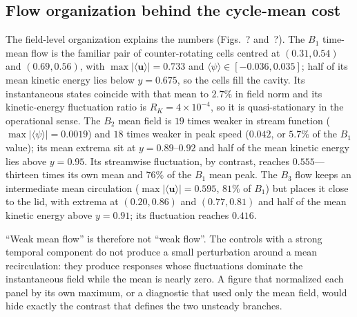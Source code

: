 \documentclass[11pt,a4paper]{article}
\newenvironment{chgdel}{\par\color{red}}{\par\color{black}}
\begin{document}
\subsection{Flow organization behind the cycle-mean cost}
\label{sec:topology}

\begin{chgdel}
The field-level organization explains the numbers (Figs.~?
and~?). The $B_1$ time-mean flow is the familiar pair of
counter-rotating cells centred at $(0.31,0.54)$ and $(0.69,0.56)$, with
$\max|\langle\mathbf{u}\rangle|=0.733$ and $\langle\psi\rangle\in[-0.036,0.035]$;
half of its mean kinetic energy lies below $y=0.675$, so the cells fill the
cavity. Its instantaneous states coincide with that mean to $2.7\%$ in field norm
and its kinetic-energy fluctuation ratio is $R_K=4\times10^{-4}$, so it is
quasi-stationary in the operational sense. The $B_2$ mean field is $19$ times
weaker in stream function ($\max|\langle\psi\rangle|=0.0019$) and $18$ times weaker
in peak speed ($0.042$, or $5.7\%$ of the $B_1$ value); its mean extrema sit at
$y=0.89$--$0.92$ and half of the mean kinetic energy lies above $y=0.95$. Its
streamwise fluctuation, by contrast, reaches $0.555$---thirteen times its own mean
and $76\%$ of the $B_1$ mean peak. The $B_3$ flow keeps an intermediate mean
circulation ($\max|\langle\mathbf{u}\rangle|=0.595$, $81\%$ of $B_1$) but places
it close to the lid, with extrema at $(0.20,0.86)$ and $(0.77,0.81)$ and half of
the mean kinetic energy above $y=0.91$; its fluctuation reaches $0.416$.

``Weak mean flow'' is therefore not ``weak flow''. The controls with a strong
temporal component do not produce a small perturbation around a mean
recirculation: they produce responses whose fluctuations dominate the
instantaneous field while the mean is nearly zero. A figure that normalized each
panel by its own maximum, or a diagnostic that used only the mean field, would
hide exactly the contrast that defines the two unsteady branches.
\end{chgdel}
\end{document}
